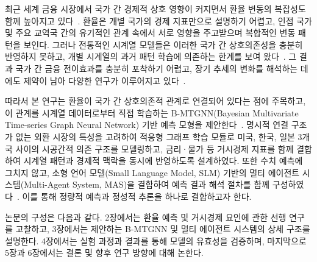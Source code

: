 \titlespacing*{\subsection}{0pt}{1.0em}{0.3em}
\titlespacing*{\paragraph}{0pt}{1.0em}{0.3em}

최근 세계 금융 시장에서 국가 간 경제적 상호 영향이 커지면서 환율 변동의 복잡성도 함께 높아지고 있다~\cite{MirandaAgrippino2020}. 환율은 개별 국가의 경제 지표만으로 설명하기 어렵고, 인접 국가 및 주요 교역국 간의 유기적인 관계 속에서 서로 영향을 주고받으며 복합적인 변동 패턴을 보인다. 그러나 전통적인 시계열 모델들은 이러한 국가 간 상호의존성을 충분히 반영하지 못하고, 개별 시계열의 과거 패턴 학습에 의존하는 한계를 보여 왔다~\cite{Fischer2018, Zhou2021Informer}. 그 결과 국가 간 금융 전이효과를 충분히 포착하기 어렵고, 장기 추세의 변화를 해석하는 데에도 제약이 남아 다양한 연구가 이루어지고 있다~\cite{Diebold2012}.

따라서 본 연구는 환율이 국가 간 상호의존적 관계로 연결되어 있다는 점에 주목하고, 이 관계를 시계열 데이터로부터 직접 학습하는 B-MTGNN(Bayesian Multivariate Time-series Graph Neural Network) 기반 예측 모형을 제안한다~\cite{Wu2020MTGNN}. 명시적 연결 구조가 없는 외환 시장의 특성을 고려하여 적응형 그래프 학습 모듈로 미국, 한국, 일본 3개국 사이의 시공간적 의존 구조를 모델링하고, 금리·물가 등 거시경제 지표를 함께 결합하여 시계열 패턴과 경제적 맥락을 동시에 반영하도록 설계하였다. 또한 수치 예측에 그치지 않고, 소형 언어 모델(Small Language Model, SLM) 기반의 멀티 에이전트 시스템(Multi-Agent System, MAS)을 결합하여 예측 결과 해석 절차를 함께 구성하였다~\cite{Yu2024FinAgent, Wu2023AutoGen}. 이를 통해 정량적 예측과 정성적 추론을 하나로 결합하고자 한다.

논문의 구성은 다음과 같다. 2장에서는 환율 예측 및 거시경제 요인에 관한 선행 연구를 고찰하고, 3장에서는 제안하는 B-MTGNN 및 멀티 에이전트 시스템의 상세 구조를 설명한다. 4장에서는 실험 과정과 결과를 통해 모델의 유효성을 검증하며, 마지막으로 5장과 6장에서는 결론 및 향후 연구 방향에 대해 논한다.
